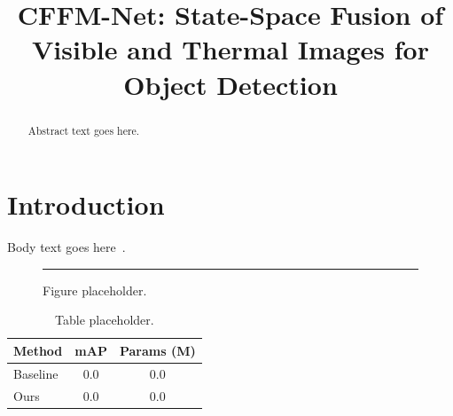 \documentclass{bmvc2k}
\title{CFFM-Net: State-Space Fusion of Visible and Thermal Images for Object Detection}
\begin{document}
\maketitle

\begin{abstract}
Abstract text goes here.
\end{abstract}

\section{Introduction}
\label{sec:intro}
Body text goes here~\cite{gu2023mamba}.

\begin{figure}[t]
  \centering
  \rule{0.8\linewidth}{4cm}
  \caption{Figure placeholder.}
  \label{fig:placeholder}
\end{figure}

\begin{table}[t]
  \centering
  \begin{tabular}{lcc}
    \hline
    Method & mAP & Params (M) \\
    \hline
    Baseline & 0.0 & 0.0 \\
    Ours & 0.0 & 0.0 \\
    \hline
  \end{tabular}
  \caption{Table placeholder.}
  \label{tab:placeholder}
\end{table}


\end{document}
